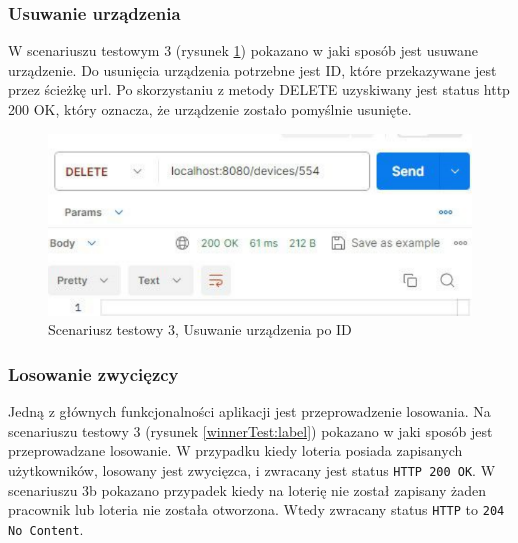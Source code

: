 \subsubsection{Usuwanie urządzenia}
W scenariuszu testowym 3 (rysunek \ref{deleteTest:label}) pokazano w jaki sposób jest usuwane urządzenie. Do usunięcia urządzenia potrzebne jest ID, które przekazywane jest przez ścieżkę url. Po skorzystaniu z metody DELETE uzyskiwany jest status http 200 OK, który oznacza, że urządzenie zostało pomyślnie usunięte.


\begin{figure}[h]
		\centering
    \includegraphics[width=0.48\linewidth]{rys06/postmanTest/delete.pdf}
    \caption{Scenariusz testowy 3, Usuwanie urządzenia po ID}
    \label{deleteTest:label}
\end{figure}


\subsubsection{Losowanie zwycięzcy}

Jedną z głównych funkcjonalności aplikacji jest przeprowadzenie losowania. Na scenariuszu testowy 3 (rysunek \ref{winnerTest:label}) pokazano w jaki sposób jest przeprowadzane losowanie. W przypadku kiedy loteria posiada zapisanych użytkowników, losowany jest zwycięzca, i zwracany jest status \mbox{\texttt{HTTP 200 OK}}. W scenariuszu 3b pokazano przypadek kiedy na loterię nie został zapisany żaden pracownik lub loteria nie została otworzona. Wtedy  zwracany status \texttt{HTTP} to \texttt{204 No Content}. 


